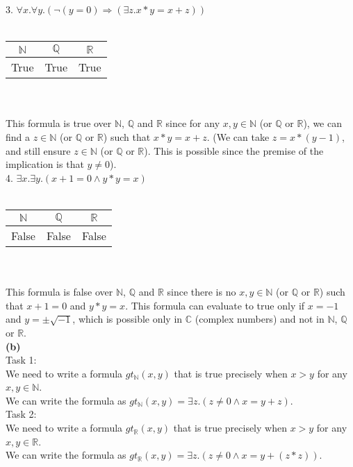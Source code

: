 \documentclass[12pt,letterpaper, onecolumn]{exam}
\begin{document}
\begin{questions}
	3. $ \forall x. \forall y. (\neg(y = 0) \Rightarrow (\exists z. x * y = x + z)) $ \\ \\
	\begin{tabular}{ |c|c|c| }
		\hline
		$\mathbb{N}$ & $\mathbb{Q}$ & $\mathbb{R}$ \\
		\hline
		True & True & True \\
		\hline
	\end{tabular} \\ \\
	This formula is true over $\mathbb{N}$, $\mathbb{Q}$ and $\mathbb{R}$ since for any $x, y \in \mathbb{N}$ (or $\mathbb{Q}$ or $\mathbb{R}$),
	we can find a $z \in \mathbb{N}$ (or $\mathbb{Q}$ or $\mathbb{R}$) such that $x * y = x + z$. (We can take $z = x * (y - 1)$, and still ensure
	$ z \in \mathbb{N} $ (or $\mathbb{Q}$ or $\mathbb{R}$). This is possible since the premise of the implication is that $y \neq 0$). \\

	4. $ \exists x. \exists y. (x + 1 = 0 \land y * y = x) $ \\ \\
	\begin{tabular}{ |c|c|c| }
		\hline
		$\mathbb{N}$ & $\mathbb{Q}$ & $\mathbb{R}$ \\
		\hline
		False & False & False \\
		\hline
	\end{tabular} \\ \\
	This formula is false over $\mathbb{N}$, $\mathbb{Q}$ and $\mathbb{R}$ since there is no $x, y \in \mathbb{N}$ (or $\mathbb{Q}$ or $\mathbb{R}$)
	such that $x + 1 = 0$ and $y * y = x$. This formula can evaluate to true only if $x = -1$ and $y = \pm \sqrt{-1}$, which is possible 
	only in $\mathbb{C}$ (complex numbers) and not in $\mathbb{N}$, $\mathbb{Q}$ or $\mathbb{R}$. \\

	\textbf{(b)} \\
	Task 1: \\
	We need to write a formula $ gt_{\mathbb{N}}(x, y) $ that is true precisely when $ x > y $ for any $ x, y \in \mathbb{N} $. \\
	We can write the formula as $ gt_{\mathbb{N}}(x, y) = \exists z. (z \neq 0 \land x = y + z) $. \\

	Task 2: \\
	We need to write a formula $ gt_{\mathbb{R}}(x, y) $ that is true precisely when $ x > y $ for any $ x, y \in \mathbb{R} $. \\
	We can write the formula as $ gt_{\mathbb{R}}(x, y) = \exists z. (z \neq 0 \land x = y + (z * z)) $. \\
	

\end{questions}
\end{document}
